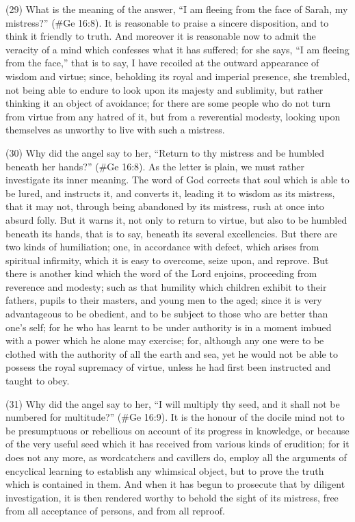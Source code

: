 (29) What is the meaning of the answer, ``I am fleeing from the face of Sarah, my mistress?''
(\#Ge 16:8). It is reasonable to praise a sincere disposition, and to think it friendly to truth. And
moreover it is reasonable now to admit the veracity of a mind which confesses what it has
suffered; for she says, ``I am fleeing from the face,'' that is to say, I have recoiled at the outward
appearance of wisdom and virtue; since, beholding its royal and imperial presence, she trembled,
not being able to endure to look upon its majesty and sublimity, but rather thinking it an object of
avoidance; for there are some people who do not turn from virtue from any hatred of it, but from a
reverential modesty, looking upon themselves as unworthy to live with such a mistress.

(30) Why did the angel say to her, ``Return to thy mistress and be humbled beneath her hands?''
(\#Ge 16:8). As the letter is plain, we must rather investigate its inner meaning. The word of
God corrects that soul which is able to be lured, and instructs it, and converts it, leading it to
wisdom as its mistress, that it may not, through being abandoned by its mistress, rush at once into
absurd folly. But it warns it, not only to return to virtue, but also to be humbled beneath its hands,
that is to say, beneath its several excellencies. But there are two kinds of humiliation; one, in
accordance with defect, which arises from spiritual infirmity, which it is easy to overcome, seize
upon, and reprove. But there is another kind which the word of the Lord enjoins, proceeding from
reverence and modesty; such as that humility which children exhibit to their fathers, pupils to their
masters, and young men to the aged; since it is very advantageous to be obedient, and to be
subject to those who are better than one's self; for he who has learnt to be under authority is in a
moment imbued with a power which he alone may exercise; for, although any one were to be
clothed with the authority of all the earth and sea, yet he would not be able to possess the royal
supremacy of virtue, unless he had first been instructed and taught to obey.

(31) Why did the angel say to her, ``I will multiply thy seed, and it shall not be numbered for
multitude?'' (\#Ge 16:9). It is the honour of the docile mind not to be presumptuous or rebellious
on account of its progress in knowledge, or because of the very useful seed which it has received
from various kinds of erudition; for it does not any more, as wordcatchers and cavillers do, employ
all the arguments of encyclical learning to establish any whimsical object, but to prove the truth
which is contained in them. And when it has begun to prosecute that by diligent investigation, it is
then rendered worthy to behold the sight of its mistress, free from all acceptance of persons, and
from all reproof.

